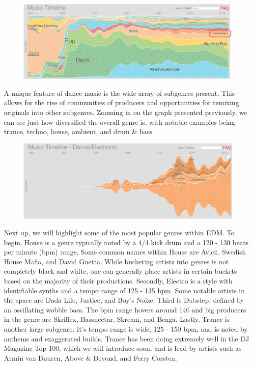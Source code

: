 \documentclass[12pt]{dalcsthesis}
\begin{document}
\begin{figure}[h]
\includegraphics[scale=.49]{genre_graph}
\centering
\end{figure}

A unique feature of dance music is the wide array of subgenres present. This allows for the rise of communities of producers and opportunities for remixing originals into other subgenres. Zooming in on the graph presented previously, we can see just how diversified the overall genre is, with notable examples being trance, techno, house, ambient, and drum \& bass. \newpage

\begin{figure}[h]
\includegraphics[scale=.65]{subgenre_graph}
\centering
\end{figure}

Next up, we will highlight some of the most popular genres within EDM. To begin, House is a genre typically noted by a 4/4 kick drum and a 120 - 130 beats per minute (bpm) range. Some common names within House are Avicii, Swedish House Mafia, and David Guetta. While bucketing artists into genres is not completely black and white, one can generally place artists in certain buckets based on the majority of their productions. Secondly, Electro is a style with identifiable synths and a tempo range of 125 - 135 bpm. Some notable artists in the space are Dada Life, Justice, and Boy's Noize. Third is Dubstep, defined by an oscillating wobble bass. The bpm range hovers around 140 and big producers in the genre are Skrillex, Bassnectar, Skream, and Benga. Lastly, Trance is another large subgenre. It's tempo range is wide, 125 - 150 bpm, and is noted by anthems and exaggerated builds. Trance has been doing extremely well in the DJ Magazine Top 100, which we will introduce soon, and is lead by artists such as Armin van Buuren, Above \& Beyond, and Ferry Corsten.
\end{document}
